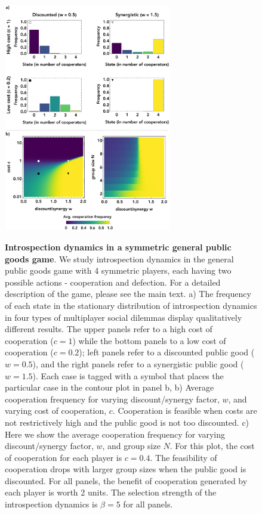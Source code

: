 \documentclass[11pt]{article}
\theoremstyle{plainCl1}
\theoremstyle{plainCl2}
\begin{document}
\clearpage
\begin{figure}
\centering
\includegraphics[width =  0.65\textwidth, keepaspectratio]{figures/figure3.eps}~\\[0.4cm]
\caption{\onehalfspacing
\textbf{Introspection dynamics in a symmetric general public goods game}. We study introspection dynamics in the general public goods game with 4 symmetric players, each having two possible actions - cooperation and defection. For a detailed description of the game, please see the main text. a) The frequency of each state in the stationary distribution of introspection dynamics in four types of multiplayer social dilemmas display qualitatively different results. The upper panels refer to a high cost of cooperation ($c=1$) while the bottom panels to a low cost of cooperation ($c = 0.2$); left panels refer to a discounted public good ($w = 0.5$), and the right panels refer to a synergistic public good ($w = 1.5$). Each case is tagged with a symbol that places the particular case in the contour plot in panel b, b) Average cooperation frequency for varying discount/synergy factor, $w$, and varying cost of cooperation, $c$. Cooperation is feasible when costs are not restrictively high and the public good is not too discounted. c) Here we show the average cooperation frequency for varying discount/synergy factor, $w$, and group size $N$. For this plot, the cost of cooperation for each player is $c = 0.4$. The feasibility of cooperation drops with larger group sizes when the public good is discounted. For all panels, the benefit of cooperation generated by each player is worth 2 units. The selection strength of the introspection dynamics is $\beta = 5$ for all panels.} 
\label{Fig:GPGG-symmetric}
\end{figure}
\end{document}
